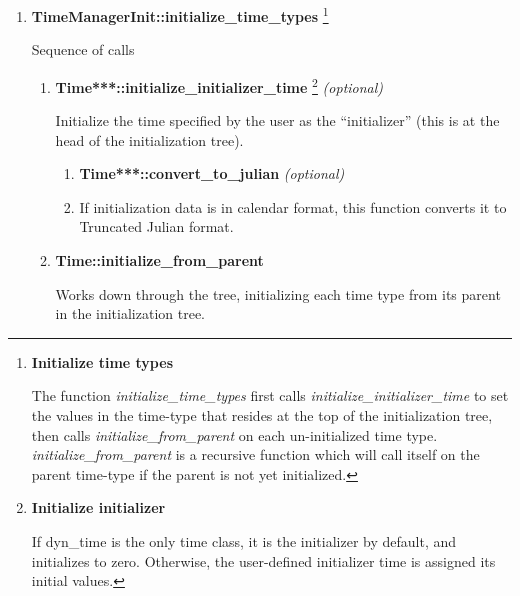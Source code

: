 {\begin{enumerate}
{\begin{enumerate}
{\begin{enumerate}
{\begin{enumerate}   %
\item \textbf{TimeManager::time\_lookup }\textit{(optional)} \par

Look up the time types by name.
\end{enumerate}}     %

\end{enumerate}}  %

\item \textbf{TimeManagerInit::initialize\_time\_types}
{\footnote{{\bf Initialize time types}\par
The function \textit{initialize\_time\_types} first
calls \textit{initialize\_initializer\_time} to set the values in the
time-type that resides at the top of the initialization tree, then
calls \textit{initialize\_from\_parent }on each un-initialized time
type.  \textit{initialize\_from\_parent }is a recursive function which
will call itself on the parent time-type if the parent is not yet
initialized.}}

Sequence of calls

{\begin{enumerate}   %
\item \textbf{Time***::initialize\_initializer\_time}
{\footnote{{\bf Initialize initializer}\par
If dyn\_time is the only time class, it is the
initializer by default, and initializes to zero.  Otherwise, the
user-defined initializer time is assigned its initial
values.}} \textit{(optional)}

Initialize the time specified by the user as the
{\textquotedblleft}initializer{\textquotedblright} (this is at the head
of the initialization tree).

{\begin{enumerate}   %
\item \textbf{Time***::convert\_to\_julian }\textit{(optional)}
\item[] If initialization data is in calendar format, this function converts it
to Truncated Julian format.
\end{enumerate}}     %

\item \textbf{Time::initialize\_from\_parent}\par
Works down through the tree, initializing each time type from its parent
in the initialization tree.


\end{enumerate}}
\end{enumerate}}
\end{enumerate}}
